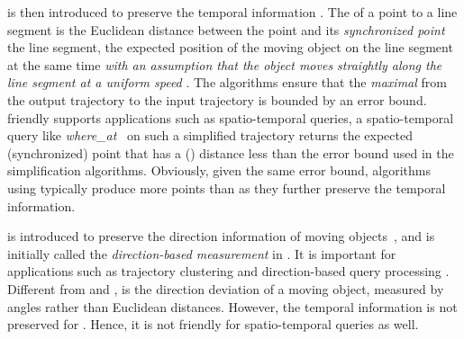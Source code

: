 { \sed is then introduced to preserve the temporal information \cite{Meratnia:Spatiotemporal,Cao:Spatio}.
The \sed of a point to a line segment is the Euclidean distance between the point and its \emph{synchronized point} \wrt the line segment, the expected position of the moving object on the line segment at the same time \emph{with an assumption that the object moves straightly along the line segment at a uniform speed} \cite{Cao:Spatio}. {The algorithms ensure that the \emph{maximal} \sed from the output trajectory to the input trajectory is bounded by an \sed error bound.}
\sed friendly supports applications such as spatio-temporal queries, \ie a spatio-temporal query like \emph{where\_at}~\cite{Cao:Spatio} on such a simplified trajectory returns the expected (synchronized) point that has a (\sed) distance less than the error bound used in the simplification algorithms.
{Obviously, given the same error bound, algorithms using \sed typically produce more points than \ped as they further preserve the temporal information.}
%



\dad is introduced to preserve the direction information of moving objects~\cite{Long:Direction, Zhang:Evaluation}, and is initially called the \emph{direction-based measurement} in \cite{Long:Direction}.
It is important for applications such as trajectory clustering and direction-based query processing \cite{Long:Direction,Long:Mining}.
{Different from \ped and \sed, \dad is the direction deviation of a moving object, measured by angles rather than Euclidean distances.}
{However, the temporal information is not preserved for \dad. Hence, it is not friendly for spatio-temporal queries as well.}



}
